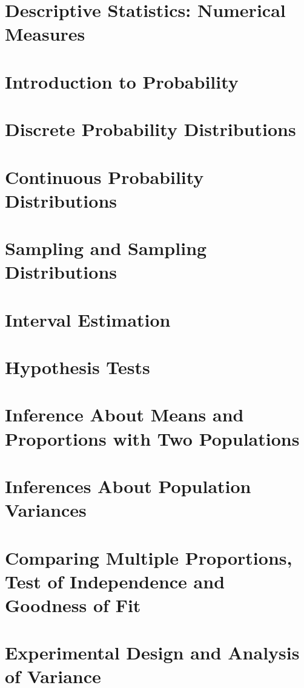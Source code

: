 \documentclass[12pt,a4paper]{report}
\begin{document}
\chapter{Descriptive Statistics: Numerical Measures}

\chapter{Introduction to Probability}

\chapter{Discrete Probability Distributions}

\chapter{Continuous Probability Distributions}

\chapter{Sampling and Sampling Distributions}

\chapter{Interval Estimation}

\chapter{Hypothesis Tests}

\chapter{Inference About Means and Proportions with Two Populations}

\chapter{Inferences About Population Variances}

\chapter{Comparing Multiple Proportions, Test of Independence and Goodness of Fit}

\chapter{Experimental Design and Analysis of Variance}
\end{document}
